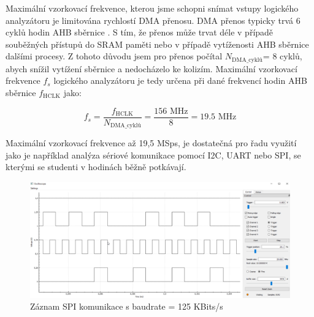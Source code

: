 Maximální vzorkovací frekvence, kterou jsme schopni snímat vstupy logického analyzátoru je limitována rychlostí DMA přenosu. DMA přenos typicky trvá 6 cyklů hodin AHB sběrnice \cite{AN_DMA}. S tím, že přenos může trvat déle v případě souběžných přístupů do SRAM paměti nebo v případě vytíženosti AHB sběrnice dalšími procesy. Z tohoto důvodu jsem pro přenos počítal $N_{\text{DMA\_cyklů}}$= 8 cyklů, abych snížil vytížení sběrnice a nedocházelo ke kolizím. Maximální vzorkovací frekvence $f_{s}$ logického analyzátoru je tedy určena při dané frekvencí hodin AHB sběrnice $f_{\text{HCLK}}$ jako:

\begin{equation}
	f_{s}=\frac{f_{\text{HCLK}}}{N_{\text{DMA\_cyklů}}}=\frac{156 \text{ MHz}}{8}=19.5\text{ MHz}
\end{equation}

 Maximální vzorkovací frekvence až 19,5 MSps, je dostatečná pro řadu využití jako je například analýza sériové komunikace pomocí I2C, UART nebo SPI, se kterými se studenti v hodinách běžně potkávají.

\begin{figure}[H]
	\centering
	\includegraphics[width=1\linewidth]{Figs/Screenshots/SPICommunicationLogicAnalyzer.png}
	\caption{Záznam SPI komunikace s baudrate = 125 KBits/s}
	\label{fig:LogicAnalyzerSPIrecord}
\end{figure}

